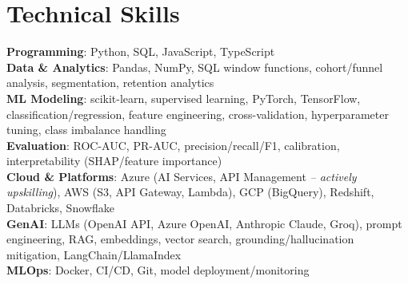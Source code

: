 \documentclass[letterpaper,11pt]{article}
\begin{document}
\section{Technical Skills}
\begin{itemize}[leftmargin=0.15in, label={}]
     \small{\item{
    \textbf{Programming}{: Python, SQL, JavaScript, TypeScript} \\
    \textbf{Data \& Analytics}{: Pandas, NumPy, SQL window functions, cohort/funnel analysis, segmentation, retention analytics} \\
    \textbf{ML Modeling}{: scikit-learn, supervised learning, PyTorch, TensorFlow, classification/regression, feature engineering, cross-validation, hyperparameter tuning, class imbalance handling} \\
    \textbf{Evaluation}{: ROC-AUC, PR-AUC, precision/recall/F1, calibration, interpretability (SHAP/feature importance)} \\
   \textbf{Cloud \& Platforms}{: Azure (AI Services, API Management \textit{-- actively upskilling}), AWS (S3, API Gateway, Lambda), GCP (BigQuery), Redshift, Databricks, Snowflake} \\
   \textbf{GenAI}{: LLMs (OpenAI API, Azure OpenAI, Anthropic Claude, Groq), prompt engineering, RAG, embeddings, vector search, grounding/hallucination mitigation, LangChain/LlamaIndex} \\
    \textbf{MLOps}{: Docker, CI/CD, Git, model deployment/monitoring}
  }}
\end{itemize}

\vspace{-20pt}


\end{document}
